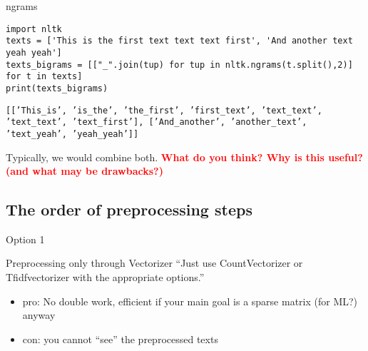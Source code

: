 \begin{frame}[fragile]{ngrams}
	\begin{lstlisting}
import nltk
texts = ['This is the first text text text first', 'And another text yeah yeah']
texts_bigrams = [["_".join(tup) for tup in nltk.ngrams(t.split(),2)] for t in texts]
print(texts_bigrams)
	\end{lstlisting}
	\texttt{[['This\_is',
		'is\_the',
		'the\_first',
		'first\_text',
		'text\_text',
		'text\_text',
		'text\_first'],
		['And\_another', 'another\_text', 'text\_yeah', 'yeah\_yeah']]
	}
	
	Typically, we would combine both.
	\pause
	\textbf{\textcolor{red}{What do you think? Why is this useful? (and what may be drawbacks?)}}
\end{frame}



\subsection{The order of preprocessing steps}

\begin{frame}{Option 1}
\begin{block}{Preprocessing only through Vectorizer}
``Just use CountVectorizer or Tfidfvectorizer with the appropriate options.''	
\begin{itemize}
	\item pro: No double work, efficient if your main goal is a sparse matrix (for ML?) anyway
	\item con: you cannot ``see'' the preprocessed texts
\end{itemize}
\end{block}
\end{frame}

